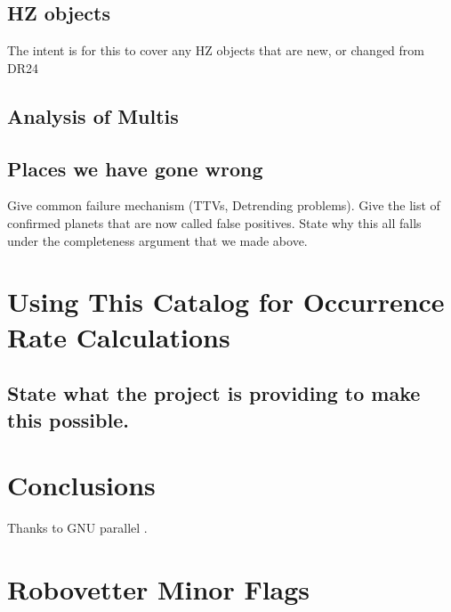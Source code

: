 \documentclass[apj,twocolappendix,numberedappendix]{emulateapj}
\renewcommand{\_}{\discretionary{\underscore}{}{\underscore}}  %
\begin{document}
\subsection{HZ objects}
The intent is for this to cover any HZ objects that are new, or changed from DR24
\subsection{Analysis of Multis}

\subsection{Places we have gone wrong}
Give common failure mechanism (TTVs, Detrending problems).  Give the list of confirmed planets that are now called false positives.  State why this all falls under the completeness argument that we made above.

\section{Using This Catalog for Occurrence Rate Calculations}
\subsection{State what the project is providing to make this possible.}


\section{Conclusions}

\acknowledgments
Thanks to GNU parallel \citep{Tange2011a}.


\section{Robovetter Minor Flags}
%


\end{document}
